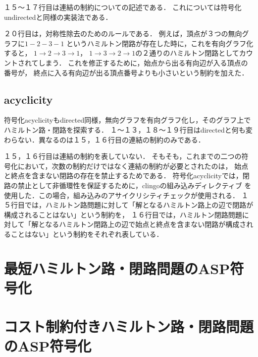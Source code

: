 １５〜１７行目は連結の制約についての記述である．
これについては符号化undirectedと同様の実装法である．

２０行目は，対称性除去のためのルールである．
例えば，頂点が３つの無向グラフに$1 - 2 - 3 - 1$
というハミルトン閉路が存在した時に，これを有向グラフ化すると，
$1 \rightarrow 2 \rightarrow 3 \rightarrow 1$，
$1 \rightarrow 3 \rightarrow 2 \rightarrow 1$の２通りのハミルトン閉路としてカウントされてしまう．
これを修正するために，始点から出る有向辺が入る頂点の番号が，
終点に入る有向辺が出る頂点番号よりも小さいという制約を加えた．
\newpage
\subsection{acyclicity}

符号化acyclicityもdirected同様，無向グラフを有向グラフ化し，そのグラフ上でハミルトン路・閉路を探索する．
１〜１３，１８〜１９行目はdirectedと何も変わらない．異なるのは１５，１６行目の連結の制約のみである．

１５，１６行目は連結の制約を表していない．
そもそも，これまでの二つの符号化において，次数の制約だけではなく連結の制約が必要とされたのは，
始点と終点を含まない閉路の存在を禁止するためである．
符号化acyclicityでは，閉路の禁止として非循環性を保証するために，clingoの組み込みディレクティブ\cite{gebser2016}
を使用した．この場合，組み込みのアサイクリシティチェック\cite{bomanson2016}が使用される．\cite{dimopoulos2018}
１５行目では，ハミルトン路問題に対して「解となるハミルトン路上の辺で閉路が構成されることはない」という制約を，
１６行目では，ハミルトン閉路問題に対して「解となるハミルトン閉路上の辺で始点と終点を含まない閉路が構成されることはない」という制約をそれぞれ表している．
\section{最短ハミルトン路・閉路問題のASP符号化}

\section{コスト制約付きハミルトン路・閉路問題のASP符号化}


